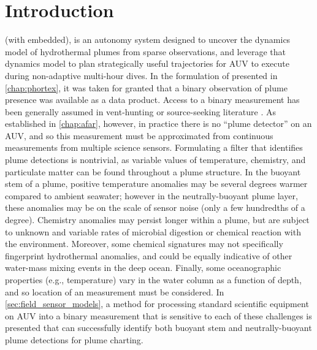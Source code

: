 

\section{Introduction}
\PHORTEX (with \PHUMES embedded), is an autonomy system designed to uncover the dynamics model of hydrothermal plumes from sparse observations, and leverage that dynamics model to plan strategically useful trajectories for AUV \Sentry to execute during non-adaptive multi-hour dives. In the formulation of \PHUMES presented in \cref{chap:phortex}, it was taken for granted that a binary observation of plume presence was available as a data product. Access to a binary measurement has been generally assumed in vent-hunting or source-seeking literature \autocite{tian2014behavior,saigol2009information,jakuba2007stochastic}. As established in \cref{chap:afar}, however, in practice there is no ``plume detector'' on an AUV, and so this measurement must be approximated from continuous measurements from multiple science sensors. Formulating a filter that identifies plume detections is nontrivial, as variable values of temperature, chemistry, and particulate matter can be found throughout a plume structure. In the buoyant stem of a plume, positive temperature anomalies may be several degrees warmer compared to ambient seawater; however in the neutrally-buoyant plume layer, these anomalies may be on the scale of sensor noise (only a few hundredths of a degree). Chemistry anomalies may persist longer within a plume, but are subject to unknown and variable rates of microbial digestion or chemical reaction with the environment. Moreover, some chemical signatures may not specifically fingerprint hydrothermal anomalies, and could be equally indicative of other water-mass mixing events in the deep ocean. Finally, some oceanographic properties (e.g., temperature) vary in the water column as a function of depth, and so location of an measurement must be considered. In \cref{sec:field_sensor_models}, a method for processing standard scientific equipment on AUV \Sentry into a binary measurement that is sensitive to each of these challenges is presented that can successfully identify both buoyant stem and neutrally-buoyant plume detections for plume charting.

